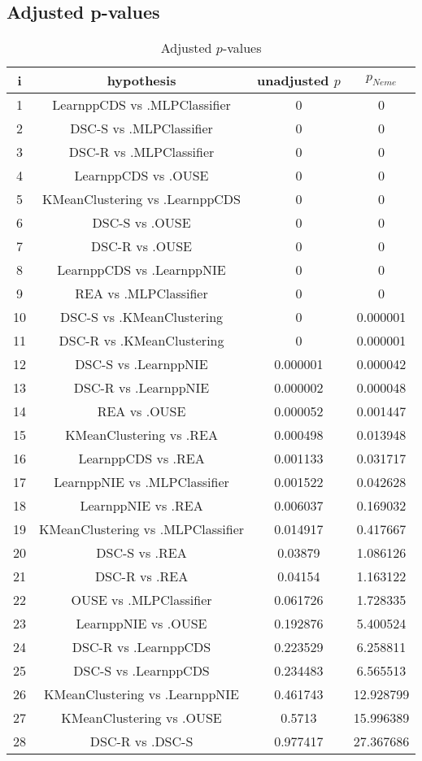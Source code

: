 \documentclass[a4paper,10pt]{article}
\begin{document}
\begin{landscape}
\pagebreak

\subsection{Adjusted p-values}

\begin{table}[!htp]
\centering\scriptsize
\begin{tabular}{cccc}
i&hypothesis&unadjusted $p$&$p_{Neme}$\\
\hline1&LearnppCDS vs .MLPClassifier&0&0\\
2&DSC-S vs .MLPClassifier&0&0\\
3&DSC-R vs .MLPClassifier&0&0\\
4&LearnppCDS vs .OUSE&0&0\\
5&KMeanClustering vs .LearnppCDS&0&0\\
6&DSC-S vs .OUSE&0&0\\
7&DSC-R vs .OUSE&0&0\\
8&LearnppCDS vs .LearnppNIE&0&0\\
9&REA vs .MLPClassifier&0&0\\
10&DSC-S vs .KMeanClustering&0&0.000001\\
11&DSC-R vs .KMeanClustering&0&0.000001\\
12&DSC-S vs .LearnppNIE&0.000001&0.000042\\
13&DSC-R vs .LearnppNIE&0.000002&0.000048\\
14&REA vs .OUSE&0.000052&0.001447\\
15&KMeanClustering vs .REA&0.000498&0.013948\\
16&LearnppCDS vs .REA&0.001133&0.031717\\
17&LearnppNIE vs .MLPClassifier&0.001522&0.042628\\
18&LearnppNIE vs .REA&0.006037&0.169032\\
19&KMeanClustering vs .MLPClassifier&0.014917&0.417667\\
20&DSC-S vs .REA&0.03879&1.086126\\
21&DSC-R vs .REA&0.04154&1.163122\\
22&OUSE vs .MLPClassifier&0.061726&1.728335\\
23&LearnppNIE vs .OUSE&0.192876&5.400524\\
24&DSC-R vs .LearnppCDS&0.223529&6.258811\\
25&DSC-S vs .LearnppCDS&0.234483&6.565513\\
26&KMeanClustering vs .LearnppNIE&0.461743&12.928799\\
27&KMeanClustering vs .OUSE&0.5713&15.996389\\
28&DSC-R vs .DSC-S&0.977417&27.367686\\
\hline
\end{tabular}
\caption{Adjusted $p$-values}
\end{table}

\end{landscape}
\end{document}
